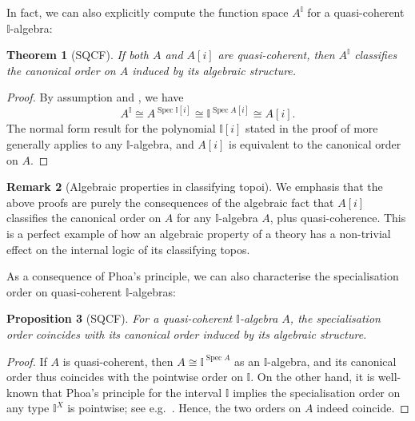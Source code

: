\documentclass[a4paper,12pt]{amsart}
\newtheorem{theorem}{Theorem}[section]
\newtheorem{proposition}[theorem]{Proposition}
\theoremstyle{definition}
\newtheorem{remark}[theorem]{Remark}
\newcommand{\mbb}[1]{\mathbb{#1}}
\newcommand{\I}{\mbb I}
\newcommand{\spec}{\operatorname{Spec}}
\begin{document}


In fact, we can also explicitly compute the function space $A^\I$ for a quasi-coherent $\I$-algebra:

\begin{theorem}[SQCF]\label{thm:algebraphoa}
  If both $A$ and $A[i]$ are quasi-coherent, then $A^\I$ classifies the canonical order on $A$ induced by its algebraic structure.
\end{theorem}
\begin{proof}
  By assumption and , we have
  \[ A^\I \cong A^{\spec \I[i]} \cong \I^{\spec A[i]} \cong A[i]. \]
  The normal form result for the polynomial $\I[i]$ stated in the proof of  more generally applies to any $\I$-algebra, and $A[i]$ is equivalent to the canonical order on $A$.
\end{proof}

\begin{remark}[Algebraic properties in classifying topoi]\label{rem:normalalgebra}
  We emphasis that the above proofs are purely the consequences of the algebraic fact that $A[i]$ classifies the canonical order on $A$ for any $\I$-algebra $A$, plus quasi-coherence. This is a perfect example of how an algebraic property of a theory has a non-trivial effect on the internal logic of its classifying topos.
\end{remark}

As a consequence of Phoa's principle, we can also characterise the specialisation order on quasi-coherent $\I$-algebras:

\begin{proposition}[SQCF]\label{cor:specordonalgiscan}
  For a quasi-coherent $\I$-algebra $A$, the specialisation order coincides with its canonical order induced by its algebraic structure.
\end{proposition}
\begin{proof}
  If $A$ is quasi-coherent, then $A \cong \I^{\spec A}$ as an $\I$-algebra, and its canonical order thus coincides with the pointwise order on $\I$. On the other hand, it is well-known that Phoa's principle for the interval $\I$ implies the specialisation order on any type $\I^X$ is pointwise; see e.g.~\cite[Thm. 4.2.1]{hyland1990first}. Hence, the two orders on $A$ indeed coincide.
\end{proof}
\end{document}
